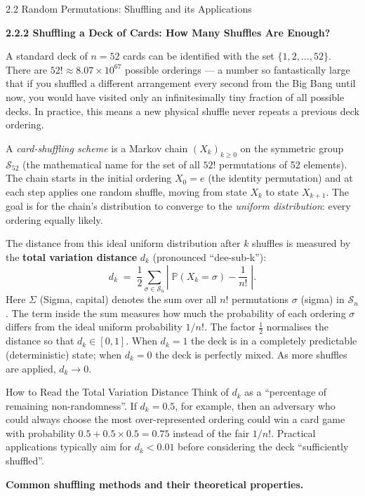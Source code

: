 \documentclass[aspectratio=169,10pt]{beamer}
\begin{document}
\begin{frame}[allowframebreaks]{2.2 Random Permutations: Shuffling and its Applications}
\framebreak

\textbf{2.2.2 Shuffling a Deck of Cards: How Many Shuffles Are Enough?}

A standard deck of $n = 52$ cards can be identified with the set
$\{1, 2, \ldots, 52\}$.  There are $52! \approx 8.07 \times 10^{67}$ possible
orderings --- a number so fantastically large that if you shuffled a different
arrangement every second from the Big Bang until now, you would have visited
only an infinitesimally tiny fraction of all possible decks.  In practice,
this means a new physical shuffle never repeats a previous deck ordering.

A \emph{card-shuffling scheme} is a Markov chain $(X_k)_{k \ge 0}$ on the
symmetric group $\mathcal{S}_{52}$ (the mathematical name for the set of all
$52!$ permutations of 52 elements).  The chain starts in the initial ordering
$X_0 = e$ (the identity permutation) and at each step applies one random
shuffle, moving from state $X_k$ to state $X_{k+1}$.  The goal is for the
chain's distribution to converge to the \emph{uniform distribution}: every
ordering equally likely.

The distance from this ideal uniform distribution after $k$ shuffles is
measured by the \textbf{total variation distance} $d_k$ (pronounced
``dee-sub-k''):
\[
  d_k \;=\; \frac{1}{2}\sum_{\sigma \in \mathcal{S}_n}
            \left|\;\mathbb{P}(X_k = \sigma) - \frac{1}{n!}\;\right|.
\]
Here $\Sigma$ (Sigma, capital) denotes the sum over all $n!$ permutations
$\sigma$ (sigma) in $\mathcal{S}_n$.  The term inside the sum measures how
much the probability of each ordering $\sigma$ differs from the ideal uniform
probability $1/n!$.  The factor $\tfrac{1}{2}$ normalises the distance so
that $d_k \in [0,1]$.  When $d_k = 1$ the deck is in a completely predictable
(deterministic) state; when $d_k = 0$ the deck is perfectly mixed.  As more
shuffles are applied, $d_k \to 0$.

\begin{block}{How to Read the Total Variation Distance}
Think of $d_k$ as a ``percentage of remaining non-randomness''.  If $d_k =
0.5$, for example, then an adversary who could always choose the most
over-represented ordering could win a card game with probability $0.5 + 0.5 \times 0.5
= 0.75$ instead of the fair $1/n!$.  Practical applications typically aim for
$d_k < 0.01$ before considering the deck ``sufficiently shuffled''.
\end{block}

\medskip
\textbf{Common shuffling methods and their theoretical properties.}


\end{frame}
\end{document}

